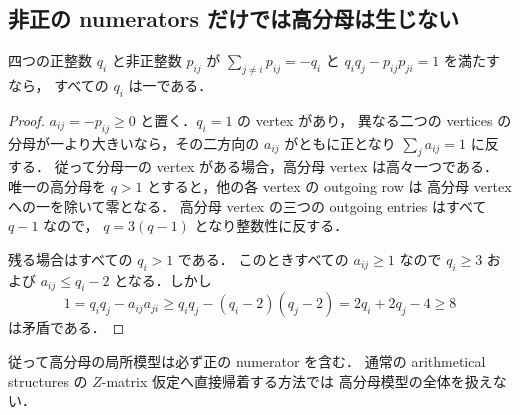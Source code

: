 \subsection{非正の numerators だけでは高分母は生じない}
\label{lit10:nonpositive}

\begin{lemma}\label{lit10:nonpositive-q1}
四つの正整数 $q_i$ と非正整数 $p_{ij}$ が
$\sum_{j\ne i}p_{ij}=-q_i$ と $q_iq_j-p_{ij}p_{ji}=1$ を満たすなら，
すべての $q_i$ は一である．
\end{lemma}

\begin{proof}
$a_{ij}=-p_{ij}\ge0$ と置く．$q_i=1$ の vertex があり，
異なる二つの vertices の分母が一より大きいなら，その二方向の
$a_{ij}$ がともに正となり $\sum_j a_{ij}=1$ に反する．
従って分母一の vertex がある場合，高分母 vertex は高々一つである．
唯一の高分母を $q>1$ とすると，他の各 vertex の outgoing row は
高分母 vertex への一を除いて零となる．
高分母 vertex の三つの outgoing entries はすべて $q-1$ なので，
$q=3(q-1)$ となり整数性に反する．

残る場合はすべての $q_i>1$ である．
このときすべての $a_{ij}\ge1$ なので $q_i\ge3$ および
$a_{ij}\le q_i-2$ となる．しかし
\[
 1=q_iq_j-a_{ij}a_{ji}
   \ge q_iq_j-(q_i-2)(q_j-2)
   =2q_i+2q_j-4\ge8
\]
は矛盾である．
\end{proof}

従って高分母の局所模型は必ず正の numerator を含む．
通常の arithmetical structures の $Z$-matrix 仮定\cite[\S\S1--3]{CorralesValencia}へ直接帰着する方法では
高分母模型の全体を扱えない．
